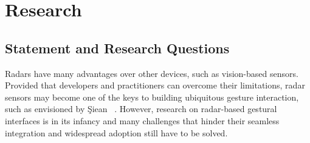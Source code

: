 \section{Research} \label{sec:introduction:research}

\subsection{Statement and Research Questions} \label{sec:introduction:research:research-questions}
Radars have many advantages over other devices, such as vision-based sensors. Provided that developers and practitioners can overcome their limitations, radar sensors may become one of the keys to building ubiquitous gesture interaction, such as envisioned by \c{S}iean \etal~\cite{Siean:2023}.
%
However, research on radar-based gestural interfaces is in its infancy and many challenges that hinder their seamless integration and widespread adoption still have to be solved.

